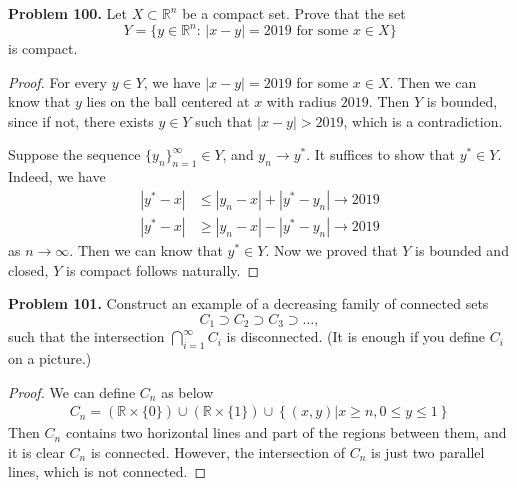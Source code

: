\documentclass[12pt,leqno]{amsart}
\theoremstyle{definition}
\numberwithin{equation}{subsection}
\begin{document}
\medskip



\noindent
{\bf Problem 100.}
Let $X\subset\mathbb{R}^n$ be a compact set.
Prove that the set
$$
Y=\big\{ y\in\mathbb{R}^n:\, \mbox{$|x-y|=2019$ for some $x\in X$}\big\}
$$
is compact.
\begin{proof}
For every $y\in Y$, we have $\left|x - y\right| = 2019$ for some $x\in X$. Then we can know that $y$ lies on the ball centered at $x$ with radius $2019$. Then $Y$ is bounded, since if not, there exists $y\in Y$ such that $\left|x - y\right| > 2019$, which is a contradiction. 

Suppose the sequence $\{y_n\}^\infty_{n=1}\in Y$, and $y_n\to y^*$. It suffices to show that $y^*\in Y$. Indeed, we have 
\begin{align*}
    \left|y^* - x\right| &\leq \left|y_n - x\right| + \left|y^* - y_n\right|\to 2019 \\
    \left|y^* - x\right| &\geq \left|y_n - x\right| - \left|y^* - y_n\right|\to 2019
\end{align*}
as $n\to\infty$. Then we can know that $y^*\in Y$. Now we proved that $Y$ is bounded and closed, $Y$ is compact follows naturally.
\end{proof}

\medskip

\noindent
{\bf Problem 101.}
Construct an example of a decreasing family of connected sets
$$
C_1\supset C_2\supset C_3\supset\ldots,
$$
such that the intersection
$\bigcap_{i=1}^\infty C_i$ is disconnected. (It is enough if you define $C_i$
on a picture.)
\begin{proof}
We can define $C_n$ as below
\begin{align*}
    C_n = \left(\mathbb{R}\times \{0\}\right) \cup \left(\mathbb{R}\times \{1\}\right) \cup \left\{(x,y) | x\geq n, 0\leq y\leq 1\right\}
\end{align*}
Then $C_n$ contains two horizontal lines and part of the regions between them, and it is clear $C_n$ is connected. However, the intersection of $C_n$ is just two parallel lines, which is not connected. 
\end{proof}

\medskip
\end{document}
